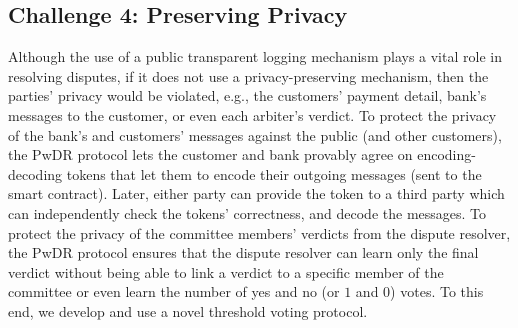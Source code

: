 \subsection{Challenge 4: Preserving Privacy}
 Although the use of a public transparent logging mechanism plays a vital role in resolving disputes, if it does not use a  privacy-preserving mechanism, then the parties' privacy would be violated, e.g., the customers' payment detail,  bank's messages to the customer, or even each arbiter's verdict. To protect the  privacy of the bank's and customers' messages against the public (and other customers), the PwDR protocol lets the customer and bank provably agree on encoding-decoding tokens that let them to encode their outgoing messages (sent to the smart contract). Later, either party can provide the token to a third party which can independently check the tokens' correctness, and decode the messages. To protect the privacy of the committee members' verdicts from the  dispute resolver, the PwDR protocol  ensures that  the dispute resolver can learn only the final verdict without being able to link a verdict to a specific  member of the committee or even learn the number of yes and no (or $1$ and $0$) votes. To this end, we develop and use a novel threshold voting protocol. 
 
 
 
 